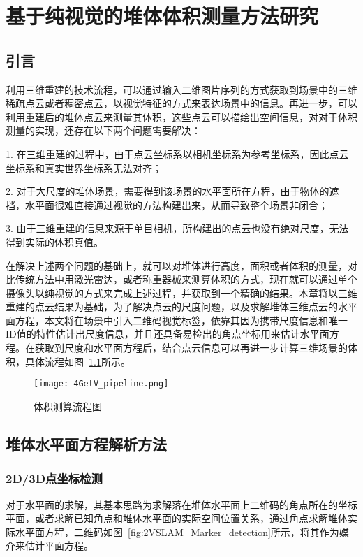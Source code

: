 \chapter{基于纯视觉的堆体体积测量方法研究}
\label{cha:chap4}
\section{引言}
\label{sec:4.1}
利用三维重建的技术流程，可以通过输入二维图片序列的方式获取到场景中的三维稀疏点云或者稠密点云，以视觉特征的方式来表达场景中的信息。再进一步，可以利用重建后的堆体点云来测量其体积，这些点云可以描绘出空间信息，对对于体积测量的实现，还存在以下两个问题需要解决：

1.	在三维重建的过程中，由于点云坐标系以相机坐标系为参考坐标系，因此点云坐标系和真实世界坐标系无法对齐；

2.	对于大尺度的堆体场景，需要得到该场景的水平面所在方程，由于物体的遮挡，水平面很难直接通过视觉的方法构建出来，从而导致整个场景非闭合；

3. 由于三维重建的信息来源于单目相机，所构建出的点云也没有绝对尺度，无法得到实际的体积真值。

在解决上述两个问题的基础上，就可以对堆体进行高度，面积或者体积的测量，对比传统方法中用激光雷达，或者称重器械来测算体积的方式，现在就可以通过单个摄像头以纯视觉的方式来完成上述过程，并获取到一个精确的结果。本章将以三维重建的点云结果为基础，为了解决点云的尺度问题，以及求解堆体三维点云的水平面方程，本文将在场景中引入二维码视觉标签，依靠其因为携带尺度信息和唯一ID值的特性估计出尺度信息，并且还具备易检出的角点坐标用来估计水平面方程。在获取到尺度和水平面方程后，结合点云信息可以再进一步计算三维场景的体积，具体流程如图~\ref{fig:4GetV_pipeline}所示。
\begin{figure}[H] %
    \centering
    \texttt{[image: 4GetV\_pipeline.png]}
    \caption{体积测算流程图}
    \label{fig:4GetV_pipeline}
  \end{figure}
\section{堆体水平面方程解析方法}
\label{sec:4.2}
\subsection{2D/3D点坐标检测}
\label{sec:4.2.1}
对于水平面的求解，其基本思路为求解落在堆体水平面上二维码的角点所在的坐标平面，或者求解已知角点和堆体水平面的实际空间位置关系，通过角点求解堆体实际水平面方程，二维码如图~\ref{fig:2VSLAM_Marker_detection}所示，将其作为媒介来估计平面方程。

